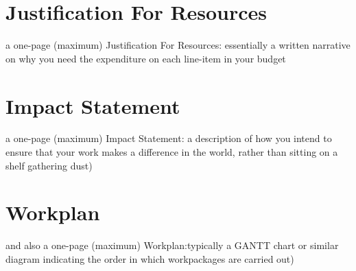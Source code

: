 \documentclass[a4paper,11pt]{article}
\begin{document}
\newpage
\section*{Justification For Resources}

a one-page (maximum) Justification For Resources: essentially a written narrative on why you need the expenditure on each line-item in your budget

\newpage
\section*{Impact Statement}

a one-page (maximum) Impact Statement: a description of how you intend to ensure that your work makes a difference in the world, rather than sitting on a shelf gathering dust)

\newpage
\section*{Workplan}

and also a one-page (maximum) Workplan:typically a GANTT chart or similar diagram indicating the order in which workpackages are carried out)
\end{document}
